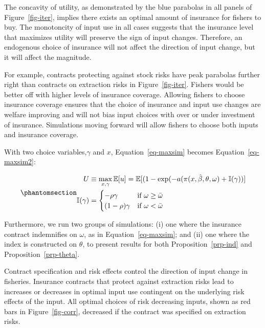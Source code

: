 \documentclass[
  letterpaper,
  DIV=11,
  numbers=noendperiod]{scrartcl}
\theoremstyle{plain}
\theoremstyle{plain}
\theoremstyle{remark}
\begin{document}
The concavity of utility, as demonstrated by the blue parabolas in all
panels of Figure~\ref{fig-iter}, implies there exists an optimal amount
of insurance for fishers to buy. The monotoncity of input use in all
cases suggests that the insurance level that maximizes utility will
preserve the sign of input changes. Therefore, an endogenous choice of
insurance will not affect the direction of input change, but it will
affect the magnitude.

For example, contracts protecting against stock risks have peak
parabolas further right than contracts on extraction risks in
Figure~\ref{fig-iter}. Fishers would be better off with higher levels of
insurance coverage. Allowing fishers to choose insurance coverage
ensures that the choice of insurance and input use changes are welfare
improving and will not bias input choices with over or under investment
of insurance. Simulations moving forward will allow fishers to choose
both inputs and insurance coverage.

With two choice variables,\(\gamma\) and \(x\), Equation~\ref{eq-maxsim}
becomes Equation~\ref{eq-maxsim2}:

\begin{equation}\phantomsection\label{eq-maxsim2}{
\begin{aligned}
U&\equiv\max_{x,\gamma}\mathbb{E}[u]=\mathbb{E}[(1-\exp(-a(\pi(x,\hat\beta,\theta,\omega)+\mathbb{I}(\gamma))]\\
\mathbb{I}(\gamma)&=\begin{cases}-\rho\gamma & \text{if } \omega\ge \bar\omega\\
(1-\rho)\gamma & \text{if } \omega<\bar\omega
\end{cases}
\end{aligned}
}\end{equation}

Furthermore, we run two groups of simulations: (i) one where the
insurance contract indemnifies on \(\omega\), as in
Equation~\ref{eq-maxsim}; and (ii) one where the index is constructed on
\(\theta\), to present results for both Proposition~\ref{prp-ind} and
Proposition~\ref{prp-theta}.

Contract specification and risk effects control the direction of input
change in fisheries. Insurance contracts that protect against extraction
risks lead to increases or decreases in optimal input use contingent on
the underlying risk effects of the input. All optimal choices of risk
decreasing inputs, shown as red bars in Figure~\ref{fig-corr}, decreased
if the contract was specified on extraction risks.
\end{document}
